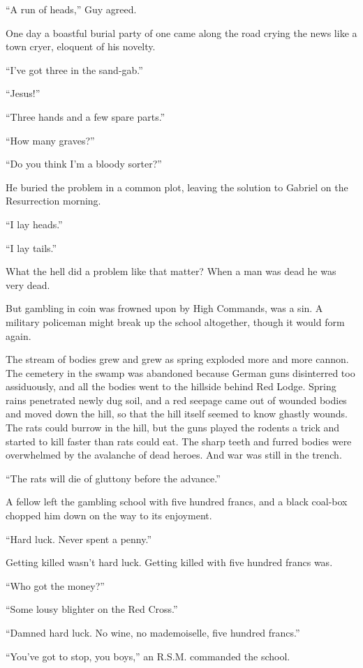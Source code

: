 ``A run of heads,'' Guy agreed.

One day a boastful burial party of one came along the road crying the news like a town cryer, eloquent of his novelty.

``I've got three in the sand-gab.''

``Jesus!''

``Three hands and a few spare parts.''

``How many graves?''

``Do you think I'm a bloody sorter?''

He buried the problem in a common plot, leaving the solution to Gabriel on the Resurrection morning.

``I lay heads.''

``I lay tails.''

What the hell did a problem like that matter? When a man was dead he was very dead.

But gambling in coin was frowned upon by High Commands, was a sin. A military policeman might break up the school altogether, though it would form again.

The stream of bodies grew and grew as spring exploded more and more cannon. The cemetery in the swamp was abandoned because German guns disinterred too assiduously, and all the bodies went to the hillside behind Red Lodge. Spring rains penetrated newly dug soil, and a red seepage came out of wounded bodies and moved down the hill, so that the hill itself seemed to know ghastly wounds. The rats could burrow in the hill, but the guns played the rodents a trick and started to kill faster than rats could eat. The sharp teeth and furred bodies were overwhelmed by the avalanche of dead heroes. And war was still in the trench.

``The rats will die of gluttony before the advance.''

A fellow left the gambling school with five hundred francs, and a black coal-box chopped him down on the way to its enjoyment.

``Hard luck. Never spent a penny.''

Getting killed wasn't hard luck. Getting killed with five hundred francs was.

``Who got the money?''

``Some lousy blighter on the Red Cross.''

``Damned hard luck. No wine, no mademoiselle, five hundred francs.''

``You've got to stop, you boys,'' an R.S.M. commanded the school.


